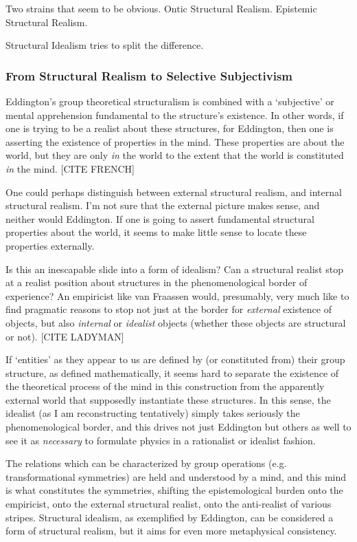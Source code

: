 Two strains that seem to be obvious.  Ontic Structural Realism.  Epistemic Structural Realism.

Structural Idealism tries to split the difference.




\subsubsection{From Structural Realism to Selective Subjectivism}

Eddington's group theoretical structuralism is combined with a `subjective' or mental apprehension fundamental to the structure's existence.  In other words, if one is trying to be a realist about these structures, for Eddington, then one is asserting the existence of properties in the mind.  These properties are about the world, but they are only \emph{in} the world to the extent that the world is constituted \emph{in} the mind.  [CITE FRENCH]  

One could perhaps distinguish between external structural realism, and internal structural realism.  I'm not sure that the external picture makes sense, and neither would Eddington.  If one is going to assert fundamental structural properties about the world, it seems to make little sense to locate these properties externally.  

Is this an inescapable slide into a form of idealism?  Can a structural realist stop at a realist position about structures in the phenomenological border of experience?  An empiricist like van Fraassen would, presumably, very much like to find pragmatic reasons to stop not just at the border for \emph{external} existence of objects, but also \emph{internal} or \emph{idealist} objects (whether these objects are structural or not).  [CITE LADYMAN]

If `entities' as they appear to us are defined by (or constituted from) their group structure, as defined mathematically, it seems hard to separate the existence of the theoretical process of the mind in this construction from the apparently external world that supposedly instantiate these structures.  In this sense, the idealist (as I am reconstructing tentatively) simply takes seriously the phenomenological border, and this drives not just Eddington but others as well to see it as \emph{necessary} to formulate physics in a rationalist or idealist fashion.  

The relations which can be characterized by group operations (e.g. transformational symmetries) are held and understood by a mind, and this mind is what constitutes the symmetries, shifting the epistemological burden onto the empiricist, onto the external structural realist, onto the anti-realist of various stripes.  Structural idealism, as exemplified by Eddington, can be considered a form of structural realism, but it aims for even more metaphysical consistency.  

